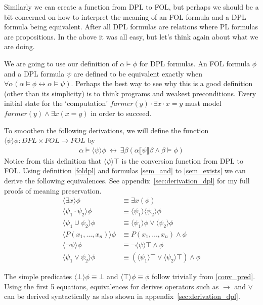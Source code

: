 \documentclass[12pt]{article}
\begin{document}
Similarly we can create a function from DPL to FOL, but perhaps we should be a bit concerned on how to interpret the meaning of an FOL formula and a DPL formula being equivalent. After all DPL formulas are relations where PL formulas are propositions. In the above it was all easy, but let's think again about what we are doing.

We are going to use our definition of $\alpha\models\phi$ for DPL formulas. An FOL formula $\phi$ and a DPL formula $\psi$ are defined to be equivalent exactly when $\forall\alpha(\alpha\models\phi\leftrightarrow\alpha\models\psi)$. Perhaps the best way to see why this is a good definition (other than its simplicity) is to think programs and weakest preconditions. Every initial state for the `computation' $farmer(y)\cdot\exists x\cdot x=y$ must model $farmer(y)\wedge\exists x(x=y)$ in order to succeed.

To smoothen the following derivations, we will define the function $\langle\psi\rangle\phi:DPL\times FOL\to FOL$ by
\begin{align}
\alpha\models\langle\psi\rangle\phi\ \leftrightarrow\ \exists\beta(\alpha\llbracket\psi\rrbracket\beta \wedge \beta\models\phi)\label{foldpl}
\end{align}
Notice from this definition that $\langle\psi\rangle\top$ is the conversion function from DPL to FOL.
Using definition \eqref{foldpl} and formulas \eqref{sem_and} to \eqref{sem_exists} we can derive the following equivalences. See appendix~\ref{sec:derivation_dpl} for my full proofs of meaning preservation.
%
\begin{align}
\langle\exists x\rangle\phi & \equiv \exists x (\phi) \label{conv_exists}\\
\langle\psi_1\cdot\psi_2\rangle\phi & \equiv \langle\psi_1\rangle\langle\psi_2\rangle\phi \label{conv_and}\\
\langle\psi_1 \cup \psi_2\rangle\phi & \equiv \langle\psi_1\rangle\phi \vee \langle\psi_2\rangle\phi \label{conv_or}\\
\langle P(x_1,\dots,x_n)\rangle\phi & \equiv  P(x_1,\dots,x_n) \wedge \phi \label{conv_pred}\\
\langle\neg\psi\rangle\phi & \equiv  \neg\langle\psi\rangle\top \wedge \phi \label{conv_neg}\\
\langle\psi_1\vee\psi_2\rangle\phi & \equiv (\langle\psi_1\rangle\top \vee \langle\psi_2\rangle\top) \wedge\phi \label{conv_vee}
\end{align}

The simple predicates $\langle\bot\rangle\phi\equiv\bot$ and $\langle\top\rangle\phi\equiv\phi$ follow trivially from \eqref{conv_pred}. Using the first 5 equations, equivalences for derives operators such as $\rightarrow$ and $\vee$ can be derived syntactically as also shown in appendix~\ref{sec:derivation_dpl}.
\end{document}
